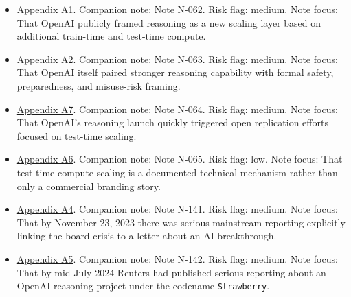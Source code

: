 \documentclass[
  american,
  11pt,
  letterpaper,
]{article}
\begin{document}
\begin{itemize}
  note: Note N-061. Risk flag: low. Note focus: That as of July 3, 2026,
  OpenAI's official API pricing imposed a large price premium on
  \texttt{GPT-5.5\ Pro} relative to \texttt{GPT-5.5}.
\item
  \hyperref[appendix-a1-learning-to-reason-with-llms]{Appendix A1}.
  Companion note: Note N-062. Risk flag: medium. Note focus: That OpenAI
  publicly framed reasoning as a new scaling layer based on additional
  train-time and test-time compute.
\item
  \hyperref[appendix-a2-openai-o1-system-card]{Appendix A2}. Companion
  note: Note N-063. Risk flag: medium. Note focus: That OpenAI itself
  paired stronger reasoning capability with formal safety, preparedness,
  and misuse-risk framing.
\item
  \hyperref[appendix-a7-s1-simple-test-time-scaling]{Appendix A7}.
  Companion note: Note N-064. Risk flag: medium. Note focus: That
  OpenAI's reasoning launch quickly triggered open replication efforts
  focused on test-time scaling.
\item
  \hyperref[appendix-a6-scaling-llm-test-time-compute-optimally-can-be-more-effective-than-scaling-model-parameters]{Appendix
  A6}. Companion note: Note N-065. Risk flag: low. Note focus: That
  test-time compute scaling is a documented technical mechanism rather
  than only a commercial branding story.
\item
  \hyperref[appendix-a4-openai-researchers-warned-board-of-ai-breakthrough-ahead-of-ceo-ouster-sources-say]{Appendix
  A4}. Companion note: Note N-141. Risk flag: medium. Note focus: That
  by November 23, 2023 there was serious mainstream reporting explicitly
  linking the board crisis to a letter about an AI breakthrough.
\item
  \hyperref[appendix-a5-exclusive-openai-working-on-new-reasoning-technology-under-code-name-strawberry]{Appendix
  A5}. Companion note: Note N-142. Risk flag: medium. Note focus: That
  by mid-July 2024 Reuters had published serious reporting about an
  OpenAI reasoning project under the codename \texttt{Strawberry}.
\end{itemize}
\end{document}
